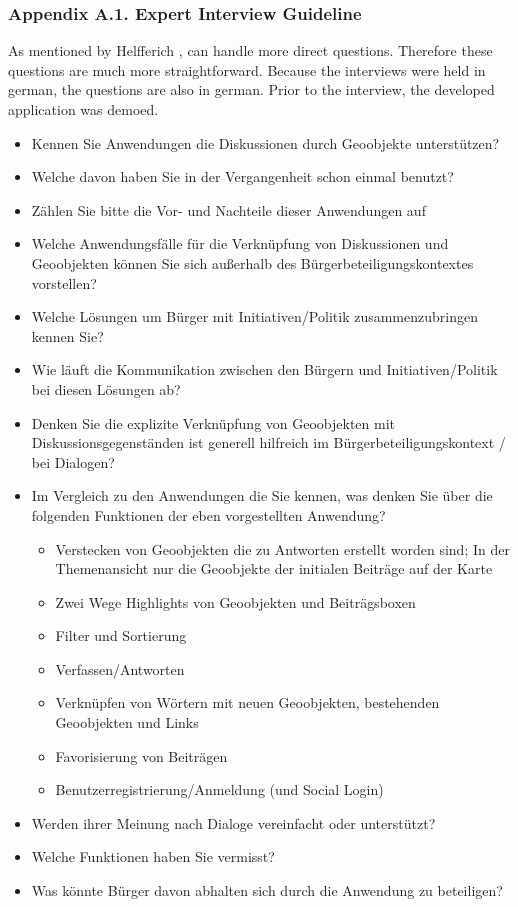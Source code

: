\documentclass{sigchi}
\begin{document}
\subsubsection{Appendix A.1. Expert Interview Guideline}

As mentioned by Helfferich \cite{helfferich2005}, can handle more direct questions. Therefore these questions are much more straightforward. Because the interviews were held in german, the questions are also in german. Prior to the interview, the developed application was demoed.
\begin{itemize}
    \item Kennen Sie Anwendungen die Diskussionen durch Geoobjekte unterst{\"u}tzen?
    \item Welche davon haben Sie in der Vergangenheit schon einmal benutzt?
    \item Z{\"a}hlen Sie bitte die Vor- und Nachteile dieser Anwendungen auf
    \item Welche Anwendungsf{\"a}lle f{\"u}r die Verkn{\"u}pfung von Diskussionen und Geoobjekten k{\"o}nnen Sie sich außerhalb des B{\"u}rgerbeteiligungskontextes vorstellen?
    \item Welche L{\"o}sungen um B{\"u}rger mit Initiativen/Politik zusammenzubringen kennen Sie?
    \item Wie l{\"a}uft die Kommunikation zwischen den B{\"u}rgern und Initiativen/Politik bei diesen L{\"o}sungen ab?
    \item Denken Sie die explizite Verkn{\"u}pfung von Geoobjekten mit Diskussionsgegenst{\"a}nden ist generell hilfreich im B{\"u}rgerbeteiligungskontext / bei Dialogen?
    \item Im Vergleich zu den Anwendungen die Sie kennen, was denken Sie {\"u}ber die folgenden Funktionen der eben vorgestellten Anwendung?
        \begin{itemize}
            \item Verstecken von Geoobjekten die zu Antworten erstellt worden sind; In der Themenansicht nur die Geoobjekte der initialen Beitr{\"a}ge auf der Karte
            \item Zwei Wege Highlights von Geoobjekten und Beitr{\"a}gsboxen
            \item Filter und Sortierung
            \item Verfassen/Antworten
            \item Verkn{\"u}pfen von W{\"o}rtern mit neuen Geoobjekten, bestehenden Geoobjekten und Links
            \item Favorisierung von Beitr{\"a}gen
            \item Benutzerregistrierung/Anmeldung (und Social Login)
        \end{itemize}
    \item Werden ihrer Meinung nach Dialoge vereinfacht oder unterst{\"u}tzt?
    \item Welche Funktionen haben Sie vermisst?
    \item Was k{\"o}nnte B{\"u}rger davon abhalten sich durch die Anwendung zu beteiligen?

\end{itemize}
\end{document}
